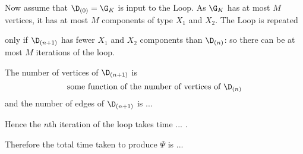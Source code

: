  Now assume that $\D_{(0)}=\G_K$ is input to the Loop. 
 As $\G_K$ has at
most $M$ vertices, it has at most $M$  components of type $X_1$ and $X_2$. 
The Loop  is repeated


 only if $\D_{(n+1)}$ has fewer  $X_1$ and $X_2$ components
than $\D_{(n)}$: so there can be at most $M$ iterations of the loop.

The number of vertices of $\D_{(n+1)}$ is
\[\textrm{some function of the number of vertices of } \D_{(n)}\]
and the number of edges of     $\D_{(n+1)}$ is ...

Hence the $n$th iteration of the loop takes time ... .

Therefore the total time taken to produce $\Psi$ is ...

